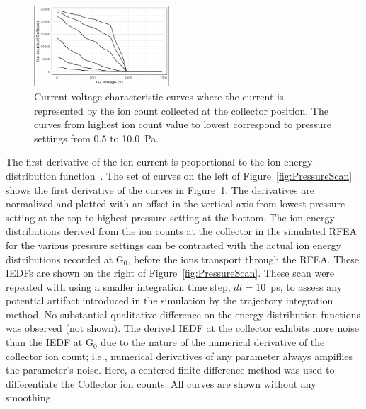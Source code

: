 \begin{figure}[htbp]
\centering
\includegraphics[width=0.45\textwidth]{Figures/IVcurve.jpeg}
\caption{Current-voltage characteristic curves where the current is represented by the ion count collected at the collector position. The curves from highest ion count value to lowest correspond to pressure settings from 0.5 to 10.0~Pa.}
\label{fig:IVcurve}
\end{figure}

The first derivative of the ion current is proportional to the ion energy distribution function~\cite{Hutchinson1987}. The set of curves on the left of Figure~\ref{fig:PressureScan} shows the first derivative of the curves in Figure~\ref{fig:IVcurve}. The derivatives are normalized and plotted with an offset in the vertical axis from lowest pressure setting at the top to highest pressure setting at the bottom. The ion energy distributions derived from the ion counts at the collector in the simulated RFEA for the various pressure settings can be contrasted with the actual ion energy distributions recorded at G$_0$, before the ions transport through the RFEA. These IEDFs are shown on the right of Figure~\ref{fig:PressureScan}. These scan were repeated with using a smaller integration time step, $dt=10$~ps, to assess any potential artifact introduced in the simulation by the trajectory integration method. No substantial qualitative difference on the energy distribution functions was observed (not shown). The derived IEDF at the collector exhibits more noise than the IEDF at G$_0$ due to the nature of the numerical derivative of the collector ion count; i.e., numerical derivatives of any parameter always ampiflies the parameter's noise. Here, a centered finite difference method was used to differentiate the Collector ion counts. All curves are shown without any smoothing.    

